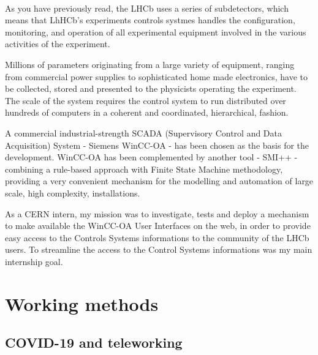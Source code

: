 \documentclass[../main.tex]{subfiles}
\begin{document}
\paragraph{}
As you have previously read, the LHCb uses a series of subdetectors, which means that LhHCb's experiments controls systmes handles the configuration, monitoring, and operation of all experimental equipment involved in the various activities of the experiment.
\par \noindent \newline
Millions of parameters originating from a large variety of equipment, ranging from commercial power supplies to sophisticated home made electronics, have to be collected, stored and presented to the physicists operating the experiment. The scale of the system requires the control system to run distributed over hundreds of computers in a coherent and coordinated, hierarchical, fashion.
\par \noindent \newline
A commercial industrial-strength SCADA (Supervisory Control and Data Acquisition) System - Siemens WinCC-OA - has been chosen as the basis for the development. WinCC-OA has been complemented by another tool - SMI++ - combining a rule-based approach with Finite State Machine methodology, providing a very convenient mechanism for the modelling and
automation of large scale, high complexity, installations. 
\par \noindent \newline
As a CERN intern, my mission was to investigate, tests and deploy a mechanism to make available the WinCC-OA User Interfaces on the web, in order to provide easy access to the Controls Systems informations to the community of the LHCb users. To streamline the access to the Control Systems informations was my main internship goal.

\section{Working methods}
\subsection{COVID-19 and teleworking}
\end{document}

